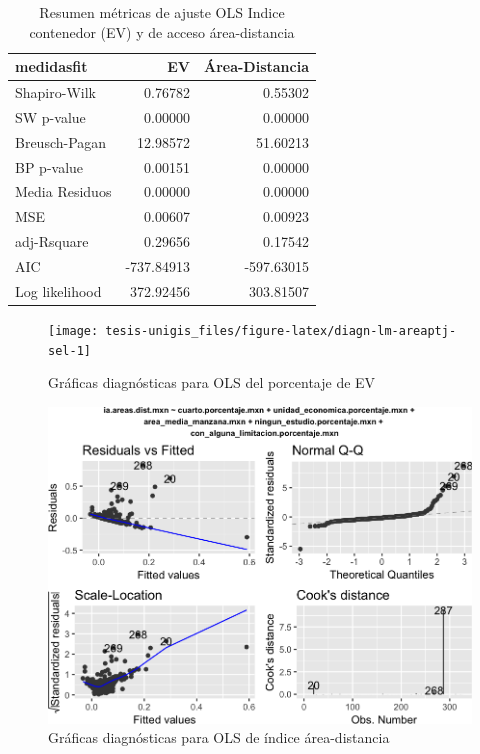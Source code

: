 \documentclass[12pt,a4paper,oneside, openany]{book}
\theoremstyle{definition}
\theoremstyle{definition}
\theoremstyle{definition}
\theoremstyle{remark}
\begin{document}
\begin{table}[H]

\caption{\label{tab:ajuste-lmev-pob-predios}Resumen métricas de ajuste OLS Indice contenedor (EV) y de acceso área-distancia }
\centering
\begin{tabular}{lrr}
\toprule
medidasfit & EV & Área-Distancia\\
\midrule
Shapiro-Wilk & 0.76782 & 0.55302\\
SW p-value & 0.00000 & 0.00000\\
Breusch-Pagan & 12.98572 & 51.60213\\
BP p-value & 0.00151 & 0.00000\\
Media Residuos & 0.00000 & 0.00000\\
\addlinespace
MSE & 0.00607 & 0.00923\\
adj-Rsquare & 0.29656 & 0.17542\\
AIC & -737.84913 & -597.63015\\
Log likelihood & 372.92456 & 303.81507\\
\bottomrule
\end{tabular}
\end{table}

\begin{figure}[H]

{\centering \texttt{[image: tesis-unigis\_files/figure-latex/diagn-lm-areaptj-sel-1]} 

}

\caption{Gráficas diagnósticas para OLS del porcentaje de EV }\label{fig:diagn-lm-areaptj-sel}
\end{figure}

\begin{figure}[H]

{\centering \includegraphics[width=1\linewidth]{tesis-unigis_files/figure-latex/diagn-lm-areadist-sel-1} 

}

\caption{Gráficas diagnósticas para OLS de índice área-distancia}\label{fig:diagn-lm-areadist-sel}
\end{figure}
\end{document}
